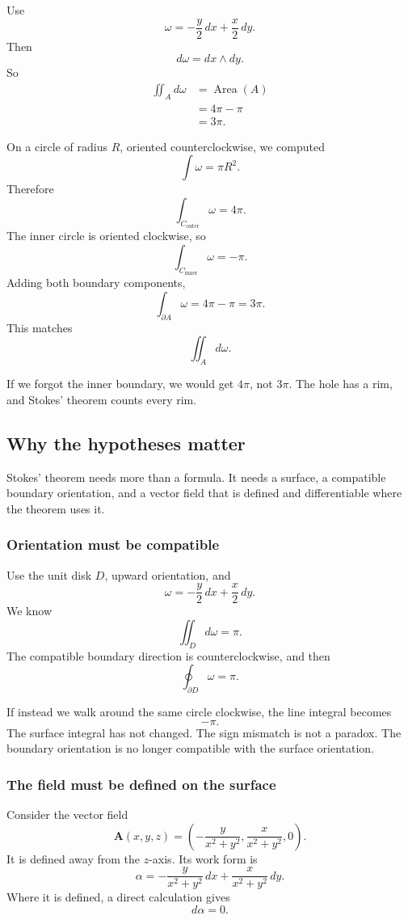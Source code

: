Use
\[
    \omega=-\frac y2\,dx+\frac x2\,dy.
\]
Then
\[
    d\omega=dx\wedge dy.
\]
So
\[
\begin{aligned}
\iint_A d\omega
&=
\operatorname{Area}(A)\\
&=
4\pi-\pi\\
&=
3\pi.
\end{aligned}
\]

On a circle of radius \(R\), oriented counterclockwise, we computed
\[
    \int \omega=\pi R^2.
\]
Therefore
\[
    \int_{C_{\text{outer}}}\omega=4\pi.
\]
The inner circle is oriented clockwise, so
\[
    \int_{C_{\text{inner}}}\omega=-\pi.
\]
Adding both boundary components,
\[
\boxed{
    \int_{\partial A}\omega=4\pi-\pi=3\pi.
}
\]
This matches
\[
    \iint_A d\omega.
\]

If we forgot the inner boundary, we would get \(4\pi\), not \(3\pi\).  The hole has a
rim, and Stokes' theorem counts every rim.

\subsection{Why the hypotheses matter}

Stokes' theorem needs more than a formula.  It needs a surface, a compatible boundary
orientation, and a vector field that is defined and differentiable where the theorem uses
it.

\subsubsection*{Orientation must be compatible}

Use the unit disk \(D\), upward orientation, and
\[
    \omega=-\frac y2\,dx+\frac x2\,dy.
\]
We know
\[
    \iint_D d\omega=\pi.
\]
The compatible boundary direction is counterclockwise, and then
\[
    \oint_{\partial D}\omega=\pi.
\]

If instead we walk around the same circle clockwise, the line integral becomes
\[
    -\pi.
\]
The surface integral has not changed.  The sign mismatch is not a paradox.  The boundary
orientation is no longer compatible with the surface orientation.

\subsubsection*{The field must be defined on the surface}

Consider the vector field
\[
    \mathbf A(x,y,z)
    =
    \left(
    -\frac{y}{x^2+y^2},
    \frac{x}{x^2+y^2},
    0
    \right).
\]
It is defined away from the \(z\)-axis.  Its work form is
\[
    \alpha=
    -\frac{y}{x^2+y^2}\,dx
    +
    \frac{x}{x^2+y^2}\,dy.
\]
Where it is defined, a direct calculation gives
\[
    d\alpha=0.
\]

